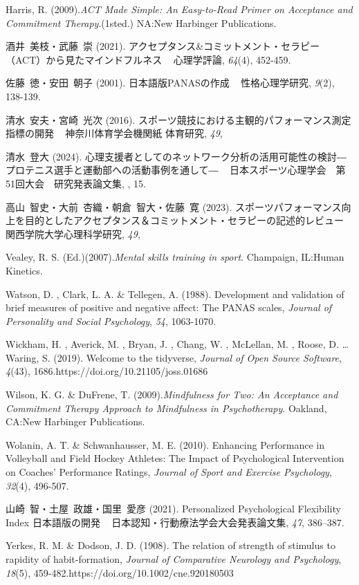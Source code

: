 \documentclass[12pt,a4paper,xelatex,ja=standard]{bxjsarticle}
\begin{document}
Harris, R.
(2009).\emph{ACT Made Simple: An Easy-to-Read Primer on Acceptance and Commitment Therapy}.(1sted.)
NA:New Harbinger Publications.

酒井~美枝・武藤~崇 (2021).
アクセプタンス\&コミットメント・セラピー（ACT）から見たマインドフルネス
~ 心理学評論, \emph{64}(4), 452-459.

佐藤~徳・安田~朝子 (2001). 日本語版PANASの作成 ~ 性格心理学研究,
\emph{9}(2), 138-139.

清水~安夫・宮崎~光次 (2016).
スポーツ競技における主観的パフォーマンス測定指標の開発 ~
神奈川体育学会機関紙 体育研究, \emph{49},

清水~登大 (2024).
心理支援者としてのネットワーク分析の活用可能性の検討―プロテニス選手と運動部への活動事例を通して―
~ 日本スポーツ心理学会　第51回大会　研究発表論文集, , 15.

高山~智史・大前~杏織・朝倉~智大・佐藤~寛 (2023).
スポーツパフォーマンス向上を目的としたアクセプタンス＆コミットメント・セラピーの記述的レビュー
~ 関西学院大学心理科学研究, \emph{49},

Vealey, R. S. (Ed.)(2007).\emph{Mental skills training in sport}.
Champaign, IL:Human Kinetics.

Watson, D. , Clark, L. A. \& Tellegen, A. (1988). Development and
validation of brief measures of positive and negative affect: The PANAS
scales, \emph{Journal of Personality and Social Psychology}, \emph{54},
1063-1070.

Wickham, H. , Averick, M. , Bryan, J. , Chang, W. , McLellan, M. ,
Roose, D. \ldots Waring, S. (2019). Welcome to the tidyverse,
\emph{Journal of Open Source Software}, \emph{4}(43),
1686.https://doi.org/10.21105/joss.01686

Wilson, K. G. \& DuFrene, T.
(2009).\emph{Mindfulness for Two: An Acceptance and Commitment Therapy Approach to Mindfulness in Psychotherapy}.
Oakland, CA:New Harbinger Publications.

Wolanin, A. T. \& Schwanhausser, M. E. (2010). Enhancing Performance in
Volleyball and Field Hockey Athletes: The Impact of Psychological
Intervention on Coaches' Performance Ratings,
\emph{Journal of Sport and Exercise Psychology}, \emph{32}(4), 496-507.

山崎~智・土屋~政雄・国里~愛彦 (2021). Personalized Psychological
Flexibility Index 日本語版の開発 ~ 日本認知・行動療法学会大会発表論文集,
\emph{47}, 386--387.

Yerkes, R. M. \& Dodson, J. D. (1908). The relation of strength of
stimulus to rapidity of habit-formation,
\emph{Journal of Comparative Neurology and Psychology}, \emph{18}(5),
459-482.https://doi.org/10.1002/cne.920180503
\end{document}
